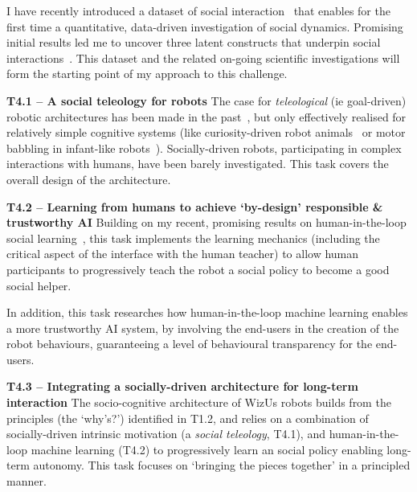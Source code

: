 \documentclass[11pt,a4paper]{report}
\newcommand{\project}{WizUs\xspace}
\begin{document}
I have recently introduced a dataset of social
interaction~\cite{lemaignan2018pinsoro} that enables for the first time a
quantitative, data-driven investigation of social dynamics. Promising initial
results led me to uncover three latent constructs that underpin social
interactions~\cite{bartlett2019what}. This dataset and the related on-going
scientific investigations will form the starting point of my approach to this
challenge.







\textbf{T4.1 -- A social teleology for robots}
The case for \emph{teleological} (ie goal-driven) robotic architectures has been
made in the past~\cite{wrede2012towards}, but only effectively realised for
relatively simple cognitive systems (like curiosity-driven robot
animals~\cite{oudeyer2005playground} or motor babbling in infant-like
robots~\cite{forestier2017unified}). Socially-driven robots, participating in
complex interactions with humans, have been barely investigated. This task
covers the overall design of the architecture.


\textbf{T4.2 -- Learning from humans to achieve `by-design' responsible \&
trustworthy AI} Building on my recent, promising results on human-in-the-loop
social learning~\cite{senft2017supervised,senft2019teaching,winkle2020couch}, this task
implements the learning mechanics (including the critical aspect of the
interface with the human teacher) to allow human participants to progressively
teach the robot a social policy to become a good social helper.

In addition, this task researches how human-in-the-loop machine learning enables a more
trustworthy AI system, by involving the end-users in the creation of the robot
behaviours, guaranteeing a level of behavioural transparency for the end-users.

\textbf{T4.3 -- Integrating a socially-driven architecture for long-term interaction} The
socio-cognitive architecture of \project robots builds from the principles (the
`why's?') identified in T1.2, and relies on a combination of socially-driven
intrinsic motivation (a \emph{social teleology}, T4.1), and human-in-the-loop machine
learning (T4.2) to progressively learn an social policy enabling long-term
autonomy. This task focuses on `bringing the pieces together' in a principled
manner.
\end{document}
